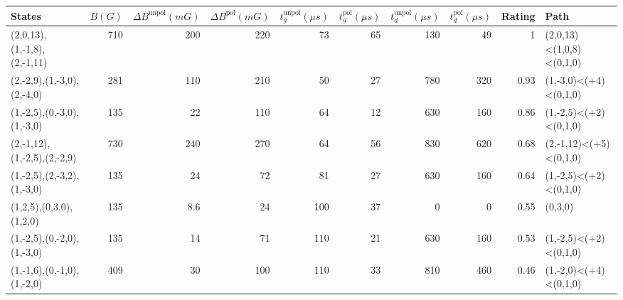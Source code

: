 \begin{tabular}{lrrrrrrrrl}
\hline
 {States}                    &   {$B(G)$} &   {$\Delta B^{\text{unpol}}(mG)$} &   {$\Delta B^{\text{pol}}(mG)$} &   {$t^{\text{unpol}}_{g}(\mu s)$} &   {$t^{\text{pol}}_{g}(\mu s)$} &   {$t^{\text{unpol}}_{d}(\mu s)$} &   {$t^{\text{pol}}_{d}(\mu s)$} &   {Rating} & {Path}                   \\
\hline
 (2,0,13),(1,-1,8),(2,-1,11) &        710 &                             200   &                             220 &                                73 &                              65 &                               130 &                              49 &       1    & (2,0,13)<(1,0,8)<(0,1,0) \\
 (2,-2,9),(1,-3,0),(2,-4,0)  &        281 &                             110   &                             210 &                                50 &                              27 &                               780 &                             320 &       0.93 & (1,-3,0)<(+4)<(0,1,0)    \\
 (1,-2,5),(0,-3,0),(1,-3,0)  &        135 &                              22   &                             110 &                                64 &                              12 &                               630 &                             160 &       0.86 & (1,-2,5)<(+2)<(0,1,0)    \\
 (2,-1,12),(1,-2,5),(2,-2,9) &        730 &                             240   &                             270 &                                64 &                              56 &                               830 &                             620 &       0.68 & (2,-1,12)<(+5)<(0,1,0)   \\
 (1,-2,5),(2,-3,2),(1,-3,0)  &        135 &                              24   &                              72 &                                81 &                              27 &                               630 &                             160 &       0.64 & (1,-2,5)<(+2)<(0,1,0)    \\
 (1,2,5),(0,3,0),(1,2,0)     &        135 &                               8.6 &                              24 &                               100 &                              37 &                                 0 &                               0 &       0.55 & (0,3,0)                  \\
 (1,-2,5),(0,-2,0),(1,-3,0)  &        135 &                              14   &                              71 &                               110 &                              21 &                               630 &                             160 &       0.53 & (1,-2,5)<(+2)<(0,1,0)    \\
 (1,-1,6),(0,-1,0),(1,-2,0)  &        409 &                              30   &                             100 &                               110 &                              33 &                               810 &                             460 &       0.46 & (1,-2,0)<(+4)<(0,1,0)    \\
\hline
\end{tabular}